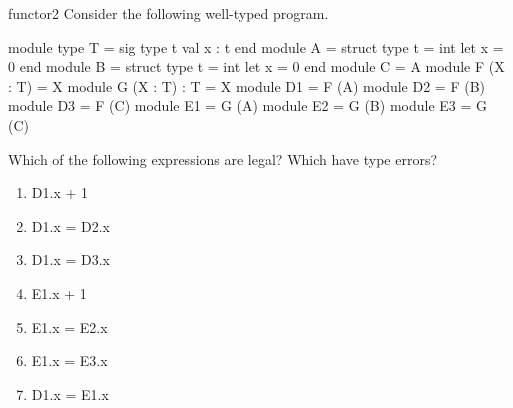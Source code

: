 % 
%
\begin{exercise}{functor2}
Consider the following well-typed program.

\begin{ocaml}
module type T = sig type t val x : t end
module A = struct type t = int let x = 0 end
module B = struct type t = int let x = 0 end
module C = A
module F (X : T) = X
module G (X : T) : T = X
module D1 = F (A)
module D2 = F (B)
module D3 = F (C)
module E1 = G (A)
module E2 = G (B)
module E3 = G (C)
\end{ocaml}
%
Which of the following expressions are legal?  Which have type errors?

\begin{enumerate}
\item

\begin{ocamllisting}
D1.x + 1
\end{ocamllisting}

\item

\begin{ocamllisting}
D1.x = D2.x
\end{ocamllisting}

\item

\begin{ocamllisting}
D1.x = D3.x
\end{ocamllisting}

\item

\begin{ocamllisting}
E1.x + 1
\end{ocamllisting}

\item

\begin{ocamllisting}
E1.x = E2.x
\end{ocamllisting}

\item

\begin{ocamllisting}
E1.x = E3.x
\end{ocamllisting}

\item

\begin{ocamllisting}
D1.x = E1.x
\end{ocamllisting}
\end{enumerate}


\end{exercise}
